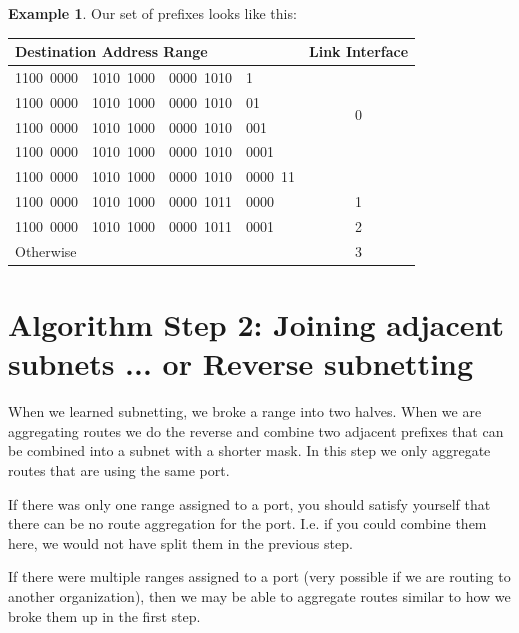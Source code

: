 \documentclass[pdf,bookmarks,colorlinks=true]{article}
\theoremstyle{definition}
\newtheorem{example}{Example}[section]
\begin{document}
\begin{example}
Our set of prefixes looks like this:\bigskip

\begin{center}
	\begin{tabular}{|l|c|}\hline
		Destination Address Range &  Link Interface \\ \hline
		1100~0000~~1010~1000~~0000~1010~~1 & \multirow{4}{*}{0}\\
		1100~0000~~1010~1000~~0000~1010~~01 & \\
		1100~0000~~1010~1000~~0000~1010~~001 & \\
		1100~0000~~1010~1000~~0000~1010~~0001 & \\
		1100~0000~~1010~1000~~0000~1010~~0000~11 & \\ \hline
		1100~0000~~1010~1000~~0000~1011~~0000 & 1\\ \hline
		1100~0000~~1010~1000~~0000~1011~~0001 & 2\\ \hline 
		Otherwise & 3 \\ \hline
	\end{tabular}\bigskip
\end{center}

\end{example}

\section{Algorithm Step 2: Joining adjacent subnets ... or Reverse subnetting}

When we learned subnetting, we broke a range into two halves. When we are aggregating routes we do the reverse and combine two adjacent prefixes that can be combined into a subnet with a shorter mask. In this step we only aggregate routes that are using the same port. 

If there was only one range assigned to a port, you should satisfy yourself that there can be no route aggregation for the port. I.e. if you could combine them here, we would not have split them in the previous step. 

If there were multiple ranges assigned to a port (very possible if we are routing to another organization), then we may be able to aggregate routes similar to how we broke them up in the first step. 
\end{document}
